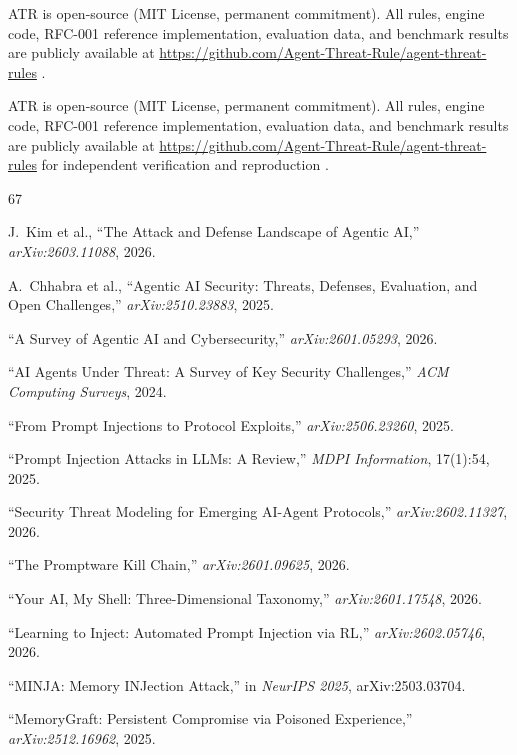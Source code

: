 \documentclass[11pt,letterpaper]{article}
\begin{document}
ATR is open-source (MIT License, permanent commitment). All rules, engine code, RFC-001 reference implementation, evaluation data, and benchmark results are publicly available at \url{https://github.com/Agent-Threat-Rule/agent-threat-rules} \cite{atr}.

ATR is open-source (MIT License, permanent commitment). All rules, engine code, RFC-001 reference implementation, evaluation data, and benchmark results are publicly available at \url{https://github.com/Agent-Threat-Rule/agent-threat-rules} for independent verification and reproduction \cite{atr}.


\begin{thebibliography}{67}

J.~Kim et al., ``The Attack and Defense Landscape of Agentic AI,'' \textit{arXiv:2603.11088}, 2026.

A.~Chhabra et al., ``Agentic AI Security: Threats, Defenses, Evaluation, and Open Challenges,'' \textit{arXiv:2510.23883}, 2025.

``A Survey of Agentic AI and Cybersecurity,'' \textit{arXiv:2601.05293}, 2026.

``AI Agents Under Threat: A Survey of Key Security Challenges,'' \textit{ACM Computing Surveys}, 2024.

``From Prompt Injections to Protocol Exploits,'' \textit{arXiv:2506.23260}, 2025.

``Prompt Injection Attacks in LLMs: A Review,'' \textit{MDPI Information}, 17(1):54, 2025.

``Security Threat Modeling for Emerging AI-Agent Protocols,'' \textit{arXiv:2602.11327}, 2026.

``The Promptware Kill Chain,'' \textit{arXiv:2601.09625}, 2026.

``Your AI, My Shell: Three-Dimensional Taxonomy,'' \textit{arXiv:2601.17548}, 2026.

``Learning to Inject: Automated Prompt Injection via RL,'' \textit{arXiv:2602.05746}, 2026.

``MINJA: Memory INJection Attack,'' in \textit{NeurIPS 2025}, arXiv:2503.03704.

``MemoryGraft: Persistent Compromise via Poisoned Experience,'' \textit{arXiv:2512.16962}, 2025.


\end{thebibliography}
\end{document}
